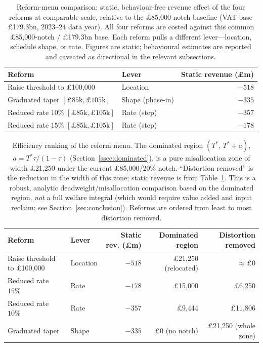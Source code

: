 \begin{table}[htbp]
\centering
\caption{Reform-menu comparison: static, behaviour-free revenue effect of the four
reforms at comparable scale, relative to the \pounds85{,}000-notch baseline (VAT
base \pounds179.3bn, 2023--24 data year). All four reforms are costed against
this common \pounds85{,}000-notch / \pounds179.3bn base. Each reform pulls a different lever---location,
schedule shape, or rate. Figures are static; behavioural estimates are reported
and caveated as directional in the relevant subsections.}
\label{tab:reform_menu}
\begin{tabular}{llr}
\toprule
Reform & Lever & Static revenue (\pounds m) \\
\midrule
Raise threshold to \pounds100{,}000 & Location & $-518$ \\
Graduated taper $[\pounds85\text{k},\pounds105\text{k}]$ & Shape (phase-in) & $-335$ \\
Reduced rate $10\%$ $[\pounds85\text{k},\pounds105\text{k}]$ & Rate (step) & $-357$ \\
Reduced rate $15\%$ $[\pounds85\text{k},\pounds105\text{k}]$ & Rate (step) & $-178$ \\
\bottomrule
\end{tabular}
\end{table}

\begin{table}[htbp]
\centering
\caption{Efficiency ranking of the reform menu. The dominated region
$(T^{*},\,T^{*}+a)$, $a=T^{*}\tau/(1-\tau)$ (Section~\ref{ssec:dominated}), is a
pure misallocation zone of width \pounds21{,}250 under the current
\pounds85{,}000/$20\%$ notch. ``Distortion removed'' is the reduction in the width
of this zone; static revenue is from Table~\ref{tab:reform_menu}. This is a
robust, analytic deadweight/misallocation comparison based on the dominated
region, \emph{not} a full welfare integral (which would require value added and
input reclaim; see Section~\ref{sec:conclusion}). Reforms are ordered from least
to most distortion removed.}
\label{tab:efficiency}
\begin{tabular}{llrrr}
\toprule
Reform & Lever & Static rev. (\pounds m) & Dominated region & Distortion removed \\
\midrule
Raise threshold to \pounds100{,}000 & Location & $-518$ & \pounds21{,}250 (relocated) & $\approx\pounds0$ \\
Reduced rate $15\%$ & Rate & $-178$ & \pounds15{,}000 & \pounds6{,}250 \\
Reduced rate $10\%$ & Rate & $-357$ & \pounds9{,}444 & \pounds11{,}806 \\
Graduated taper & Shape & $-335$ & \pounds0 (no notch) & \pounds21{,}250 (whole zone) \\
\bottomrule
\end{tabular}
\end{table}

